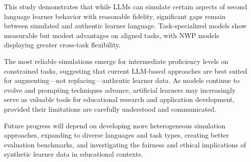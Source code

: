 This study demonstrates that while LLMs can simulate certain aspects of second language learner behavior with reasonable fidelity, significant gaps remain between simulated and authentic learner language. Task-specialized models show measurable but modest advantages on aligned tasks, with NWP models displaying greater cross-task flexibility.

The most reliable simulations emerge for intermediate proficiency levels on constrained tasks, suggesting that current LLM-based approaches are best suited for augmenting—not replacing—authentic learner data. As models continue to evolve and prompting techniques advance, artificial learners may increasingly serve as valuable tools for educational research and application development, provided their limitations are carefully understood and communicated.

Future progress will depend on developing more heterogeneous simulation approaches, expanding to diverse languages and task types, creating better evaluation benchmarks, and investigating the fairness and ethical implications of synthetic learner data in educational contexts.
